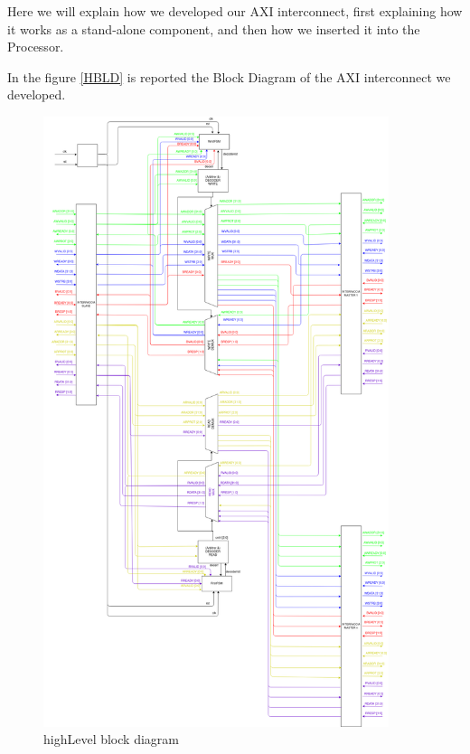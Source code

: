 Here we will explain how we developed our AXI interconnect, first explaining how it works as a stand-alone component, and then how we inserted it into the Processor.


{}
In the figure \ref{HBLD} is reported the Block Diagram of the AXI interconnect we developed.

\begin{figure}[h]
  \includegraphics[width=0.9\textwidth, angle=0]{"./../../img/Images/highLevel.png"}
  \caption{highLevel block diagram}
  \label{HLBD}
\end{figure}

